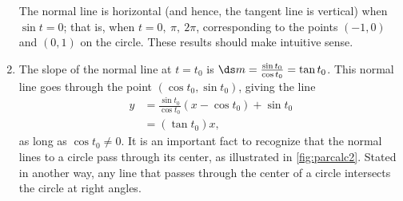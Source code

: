 \begin{example}
\begin{enumerate}
	The normal line is horizontal (and hence, the tangent line is vertical) when $\sin t=0$; that is, when $t= 0,\ \pi,\ 2\pi$, corresponding to the points $(-1,0)$ and $(0,1)$ on the circle. These results should make intuitive sense.
	\item	The slope of the normal line at $t=t_0$ is $\ds m=\frac{\sin t_0}{\cos t_0} = \tan t_0$. This normal line goes through the point $(\cos t_0,\sin t_0)$, giving the line
%
%
%
\begin{align*}
	y &=\frac{\sin t_0}{\cos t_0}(x-\cos t_0) + \sin t_0\\	
	&= (\tan t_0)x,
\end{align*}
as long as $\cos t_0\neq 0$. It is an important fact to recognize that the normal lines to a circle pass through its center, as illustrated in \autoref{fig:parcalc2}. Stated in another way, any line that passes through the center of a circle intersects the circle at right angles.
\end{enumerate}
\end{example}

